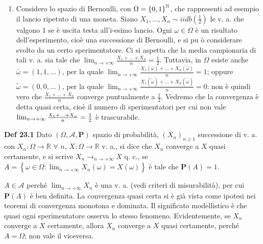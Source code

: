 \documentclass{article}
\begin{document}
\begin{enumerate}
\item Considero lo spazio di Bernoulli, con $\Omega =\left\{ 0,1\right\} ^{%
\mathbb{N}
}$, che rappresenti ad esempio il lancio ripetuto di una moneta. Siano $%
X_{1},...,X_{n}\sim iidb\left( \frac{1}{2}\right) $ le v. a. che valgono $1$
se \`{e} uscita testa all'i-esimo lancio. Ogni $\omega \in \Omega $ \`{e} un
risultato dell'esperimento, cio\`{e} una successione di Bernoulli, e si pu%
\`{o} considerare svolto da un certo sperimentatore. Ci si aspetta che la
media campionaria di tali v. a. sia tale che $\lim_{n\rightarrow +\infty }%
\frac{X_{1}+...+X_{n}}{n}=\frac{1}{2}$. Tuttavia, in $\Omega $ esiste anche $%
\bar{\omega}=\left( 1,1,...\right) $, per la quale $\lim_{n\rightarrow
+\infty }\frac{X_{1}\left( \bar{\omega}\right) +...+X_{n}\left( \bar{\omega}%
\right) }{n}=1$; oppure $\tilde{\omega}=\left( 0,0,...\right) $, per la
quale $\lim_{n\rightarrow +\infty }\frac{X_{1}\left( \tilde{\omega}\right)
+...+X_{n}\left( \tilde{\omega}\right) }{n}=0$: non \`{e} quindi vero che $%
\frac{X_{1}+...+X_{n}}{n}$ converge puntualmente a $\frac{1}{2}$. Vedremo
che la convergenza \`{e} detta quasi certa, cio\`{e} il numero di
sperimentatori per cui non vale $\lim_{n\rightarrow +\infty }\frac{%
X_{1}+...+X_{n}}{n}=\frac{1}{2}$ \`{e} trascurabile.
\end{enumerate}

\textbf{Def 23.1} Dato $\left( \Omega ,\mathcal{A},\mathbf{P}\right) $
spazio di probabilit\`{a}, $\left( X_{n}\right) _{n\geq 1}$ successione di
v. a. con $X_{n}:\Omega \rightarrow 
\mathbb{R}
$ $\forall $ $n$, $X:\Omega \rightarrow 
\mathbb{R}
$ v. a., si dice che $X_{n}$ converge a $X$ quasi certamente, e si scrive $%
X_{n}\rightarrow _{n\rightarrow +\infty }X$ q. c., se $A=\left\{ \omega \in
\Omega :\lim_{n\rightarrow +\infty }X_{n}\left( \omega \right) =X\left(
\omega \right) \right\} $ \`{e} tale che $\mathbf{P}\left( A\right) =1$.

$A\in \mathcal{A}$ perch\'{e} $\lim_{n\rightarrow +\infty }X_{n}$ \`{e} una
v. a. (vedi criteri di misurabilit\`{a}), per cui $\mathbf{P}\left( A\right) 
$ \`{e} ben definita. La convergenza quasi certa si \`{e} gi\`{a} vista come
ipotesi nei teoremi di convergenza monotona e dominata. Il significato
modellistico \`{e} che quasi ogni sperimentatore osserva lo stesso fenomeno.
Evidentemente, se $X_{n}$ converge a $X$ certamente, allora $X_{n}$ converge
a $X$ quasi certamente, perch\'{e} $A=\Omega $; non vale il viceversa.
\end{document}
